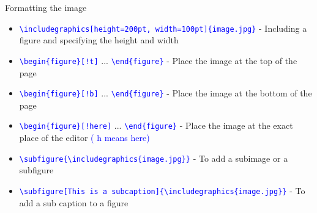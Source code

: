 \documentclass{beamer}
\begin{document}
	\begin{frame}{Formatting the image}
		\begin{itemize}
			\item \texttt{\textcolor{blue}{\textbackslash includegraphics[height=200pt, width=100pt]\{image.jpg\}}} - Including a figure and specifying the height and width
			
			\item \texttt{\textcolor{blue}{\textbackslash begin\{figure\}[!t]}} ... \texttt{\textcolor{blue}{\textbackslash end\{figure\}}} - Place the image at the top of the page
			
			\item \texttt{\textcolor{blue}{\textbackslash begin\{figure\}[!b]}} ... \texttt{\textcolor{blue}{\textbackslash end\{figure\}}} - Place the image at the bottom of the page
			
			\item \texttt{\textcolor{blue}{\textbackslash begin\{figure\}[!here]}} ... \texttt{\textcolor{blue}{\textbackslash end\{figure\}}} - Place the image at the exact place of the editor \textcolor{blue}{( h means here)}
			
			\item \texttt{\textcolor{blue}{\textbackslash subfigure\{\textbackslash includegraphics\{image.jpg\}\}}} - To add a subimage or a subfigure
			
			\item \texttt{\textcolor{blue}{\textbackslash subfigure[This is a subcaption]\{\textbackslash includegraphics\{image.jpg\}\}}} - To add a sub caption to a figure
			
		\end{itemize}
	\end{frame}
\end{document}
